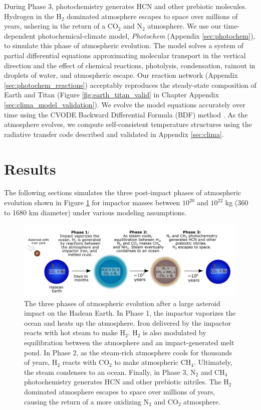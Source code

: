 During Phase 3, photochemistry generates HCN and other prebiotic molecules. Hydrogen in the H$_2$ dominated atmosphere escapes to space over millions of years, ushering in the return of a CO$_2$ and N$_2$ atmosphere. We use our time-dependent photochemical-climate model, \emph{Photochem} (Appendix \ref{sec:photochem}), to simulate this phase of atmospheric evolution. The model solves a system of partial differential equations approximating molecular transport in the vertical direction and the effect of chemical reactions, photolysis, condensation, rainout in droplets of water, and atmospheric escape. Our reaction network (Appendix \ref{sec:photochem_reactions}) acceptably reproduces the steady-state composition of Earth and Titan (Figure \ref{fig:earth_titan_valid} in Chapter Appendix \ref{sec:clima_model_validation}). We evolve the model equations accurately over time using the CVODE Backward Differential Formula (BDF) method \citep{Hindmarsh_2005}. As the atmosphere evolves, we compute self-consistent temperature structures using the radiative transfer code described and validated in Appendix \ref{sec:clima}.

\section{Results}

The following sections simulates the three post-impact phases of atmospheric evolution shown in Figure \ref{fig:impact_diagram} for impactor masses between $10^{20}$ and $10^{22}$ kg (360 to 1680 km diameter) under various modeling assumptions.

\begin{figure}
  \centering
  \includegraphics[width=1.0\textwidth]{tex/5impacts/figures/impact_diagram.pdf}
  \caption{The three phases of atmospheric evolution after a large asteroid impact on the Hadean Earth. In Phase 1, the impactor vaporizes the ocean and heats up the atmosphere. Iron delivered by the impactor reacts with hot steam to make H$_2$. H$_2$ is also modulated by equilibration between the atmosphere and an impact-generated melt pond. In Phase 2, as the steam-rich atmosphere cools for thousands of years, H$_2$ reacts with CO$_2$ to make atmospheric CH$_4$. Ultimately, the steam condenses to an ocean. Finally, in Phase 3, N$_2$ and CH$_4$ photochemistry generates HCN and other prebiotic nitriles. The H$_2$ dominated atmosphere escapes to space over millions of years, causing the return of a more oxidizing N$_2$ and CO$_2$ atmosphere.}
  \label{fig:impact_diagram}
\end{figure}


